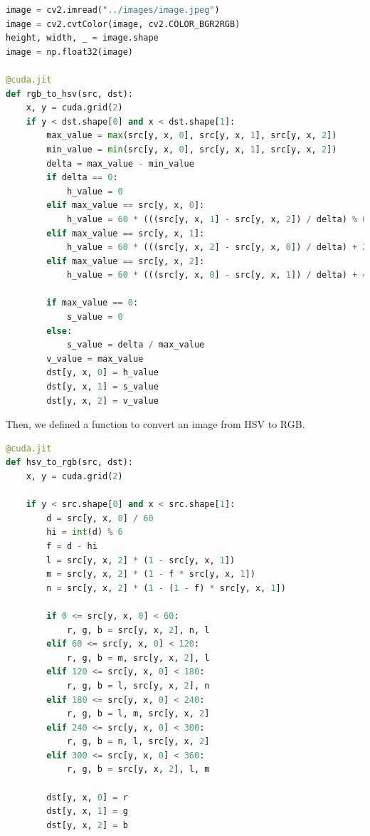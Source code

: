 \documentclass[12pt]{article}
\begin{document}
\begin{lstlisting}[language=Python]
image = cv2.imread("../images/image.jpeg")
image = cv2.cvtColor(image, cv2.COLOR_BGR2RGB)
height, width, _ = image.shape
image = np.float32(image)

@cuda.jit
def rgb_to_hsv(src, dst):
    x, y = cuda.grid(2)
    if y < dst.shape[0] and x < dst.shape[1]:
        max_value = max(src[y, x, 0], src[y, x, 1], src[y, x, 2])
        min_value = min(src[y, x, 0], src[y, x, 1], src[y, x, 2])
        delta = max_value - min_value
        if delta == 0:
            h_value = 0
        elif max_value == src[y, x, 0]:
            h_value = 60 * (((src[y, x, 1] - src[y, x, 2]) / delta) % 6)
        elif max_value == src[y, x, 1]:
            h_value = 60 * (((src[y, x, 2] - src[y, x, 0]) / delta) + 2)
        elif max_value == src[y, x, 2]:
            h_value = 60 * (((src[y, x, 0] - src[y, x, 1]) / delta) + 4)

        if max_value == 0:
            s_value = 0
        else:
            s_value = delta / max_value
        v_value = max_value
        dst[y, x, 0] = h_value
        dst[y, x, 1] = s_value
        dst[y, x, 2] = v_value


\end{lstlisting}

\noindent
Then, we defined a function to convert an image from HSV to RGB.
\begin{lstlisting}[language=Python]
@cuda.jit
def hsv_to_rgb(src, dst):
    x, y = cuda.grid(2)

    if y < src.shape[0] and x < src.shape[1]:
        d = src[y, x, 0] / 60
        hi = int(d) % 6
        f = d - hi
        l = src[y, x, 2] * (1 - src[y, x, 1])
        m = src[y, x, 2] * (1 - f * src[y, x, 1])
        n = src[y, x, 2] * (1 - (1 - f) * src[y, x, 1])

        if 0 <= src[y, x, 0] < 60:
            r, g, b = src[y, x, 2], n, l
        elif 60 <= src[y, x, 0] < 120:
            r, g, b = m, src[y, x, 2], l
        elif 120 <= src[y, x, 0] < 180:
            r, g, b = l, src[y, x, 2], n
        elif 180 <= src[y, x, 0] < 240:
            r, g, b = l, m, src[y, x, 2]
        elif 240 <= src[y, x, 0] < 300:
            r, g, b = n, l, src[y, x, 2]
        elif 300 <= src[y, x, 0] < 360:
            r, g, b = src[y, x, 2], l, m

        dst[y, x, 0] = r
        dst[y, x, 1] = g
        dst[y, x, 2] = b

\end{lstlisting}
\end{document}
